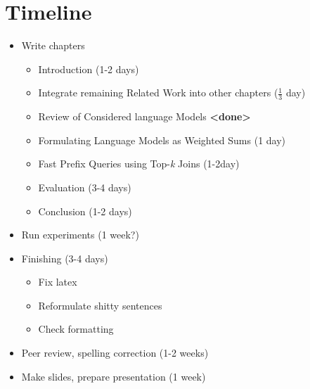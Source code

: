 \begin{landscape}
\begin{figure}[H]
{
    }
  \end{figure}
\end{landscape}

\chapter{Timeline}

\begin{itemize}
  \item Write chapters
    \begin{itemize}
      \item Introduction (1-2 days)
      \item Integrate remaining Related Work into other chapters ($\frac{1}{3}$ day)
      \item Review of Considered language Models \textbf{<done>}
      \item Formulating Language Models as Weighted Sums (1 day)
      \item Fast Prefix Queries using Top-\emph{k} Joins (1-2day)
      \item Evaluation (3-4 days)
      \item Conclusion (1-2 days)
    \end{itemize}
  \item Run experiments (1 week?)
  \item Finishing (3-4 days)
    \begin{itemize}
      \item Fix latex
      \item Reformulate shitty sentences
      \item Check formatting
    \end{itemize}
  \item Peer review, spelling correction (1-2 weeks)
  \item Make slides, prepare presentation (1 week)
\end{itemize}

